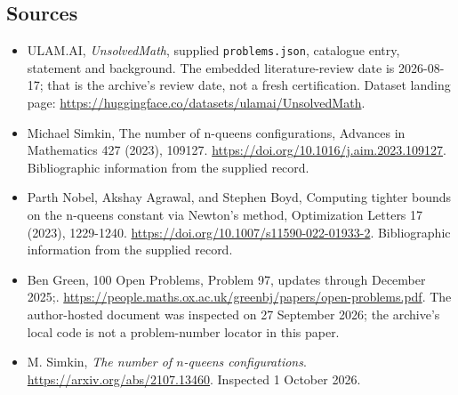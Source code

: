 \documentclass[11pt,a4paper]{article}
\begin{document}
\subsection{Sources}

{\small

\begin{itemize}

\item[\hypertarget{source:statement:1}{S1}] ULAM.AI, \emph{UnsolvedMath}, supplied \texttt{problems.json}, catalogue entry, statement and background. The embedded literature-review date is 2026-08-17; that is the archive’s review date, not a fresh certification. Dataset landing page: \url{https://huggingface.co/datasets/ulamai/UnsolvedMath}.

\item[\hypertarget{source:statement:2}{S2}] Michael Simkin, The number of n-queens configurations, Advances in Mathematics 427 (2023), 109127. \url{https://doi.org/10.1016/j.aim.2023.109127}. Bibliographic information from the supplied record.

\item[\hypertarget{source:statement:3}{S3}] Parth Nobel, Akshay Agrawal, and Stephen Boyd, Computing tighter bounds on the n-queens constant via Newton's method, Optimization Letters 17 (2023), 1229-1240. \url{https://doi.org/10.1007/s11590-022-01933-2}. Bibliographic information from the supplied record.

\item[\hypertarget{source:statement:4}{S4}] Ben Green, 100 Open Problems, Problem 97, updates through December 2025;. \url{https://people.maths.ox.ac.uk/greenbj/papers/open-problems.pdf}. The author-hosted document was inspected on 27 September 2026; the archive’s local code is not a problem-number locator in this paper.

\item[E1] M. Simkin, \emph{The number of $n$-queens configurations}. \url{https://arxiv.org/abs/2107.13460}. Inspected 1 October 2026.

\end{itemize}

}

\label{end:statement}
\end{document}
